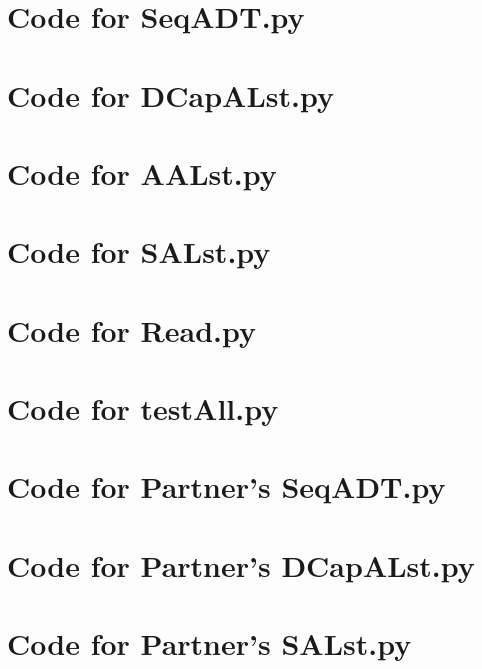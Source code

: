 \documentclass[12pt]{article}
\begin{document}
\newpage

\section{Code for SeqADT.py}

\noindent 

\newpage

\section{Code for DCapALst.py}

\noindent 

\newpage

\section{Code for AALst.py}

\noindent 

\newpage

\section{Code for SALst.py}

\noindent 

\newpage

\section{Code for Read.py}

\noindent 

\newpage

\section{Code for testAll.py}

\noindent 

\newpage

\section{Code for Partner's SeqADT.py}

\noindent 

\newpage

\section{Code for Partner's DCapALst.py}

\noindent 

\newpage

\section{Code for Partner's SALst.py}

\noindent 
\end{document}
